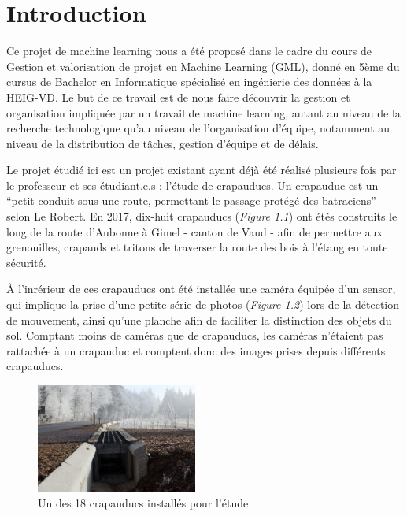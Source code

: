 \chapter{Introduction}
Ce projet de machine learning nous a été proposé dans le cadre du cours de Gestion et valorisation de projet en Machine Learning (GML), donné en 5ème du cursus de Bachelor en Informatique spécialisé en ingénierie des données à la HEIG-VD. Le but de ce travail est de nous faire découvrir la gestion et organisation impliquée par un travail de machine learning, autant au niveau de la recherche technologique qu'au niveau de l'organisation d'équipe, notamment au niveau de la distribution de tâches, gestion d'équipe et de délais. \newline

Le projet étudié ici est un projet existant ayant déjà été réalisé plusieurs fois par le professeur et ses étudiant.e.s : l'étude de crapauducs. Un crapauduc est un “petit conduit sous une route, permettant le passage protégé des batraciens” - selon Le Robert. En 2017, dix-huit crapauducs (\textit{Figure 1.1}) ont étés construits le long de la route d'Aubonne à Gimel - canton de Vaud - afin de permettre aux grenouilles, crapauds et tritons de traverser la route des bois à l'étang en toute sécurité. \newline

À l'inrérieur de ces crapauducs ont été installée une caméra équipée d'un sensor, qui implique la prise d'une petite série de photos (\textit{Figure 1.2}) lors de la détection de mouvement, ainsi qu'une planche afin de faciliter la distinction des objets du sol. Comptant moins de caméras que de crapauducs, les caméras n'étaient pas rattachée à un crapauduc et comptent donc des images prises depuis différents crapauducs.\newline

\begin{figure}[!htb]
    \centering
    \includegraphics[width=200px]{images/introduction_crapauduc_exterieur.png}
    \caption{Un des 18 crapauducs installés pour l'étude}
    \label{fig:Un des 18 crapauducs installés pour l'étude}
\end{figure}

